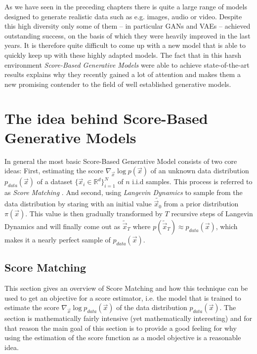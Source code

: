 As we have seen in the preceding chapters there is quite a large range of models designed to generate realistic data such as e.g. images, audio or video. Despite this high diversity only some of them – in particular GANs and VAEs – achieved outstanding success, on the basis of which they were heavily improved in the last years. It is therefore quite difficult to come up with a new model that is able to quickly keep up with these highly adapted models. The fact that in this harsh environment \textit{Score-Based Generative Models} \cite{score_1, score_3, score_2} were able to achieve state-of-the-art results explains why they recently gained a lot of attention and makes them a new promising contender to the field of well established generative models.

\section{The idea behind Score-Based Generative Models}
In general the most basic Score-Based Generative Model consists of two core ideas: First, estimating the score $\nabla_{\vec{x}}\log p(\vec{x})$ of an unknown data distribution $p_{data}(\vec{x})$ of a dataset $\{\vec{x}_i\in \mathbb{R}^d\}_{i=1}^N$ of $n$ i.i.d samples. This process is referred to as \textit{Score Matching} \cite{score_matching_original}. And second, using \textit{Langevin Dynamics} \cite{langevin1, langevin2} to sample from the data distribution by staring with an initial value $\tilde{\vec{x}_0}$ from a prior distribution $\pi(\vec{x})$. This value is then gradually transformed by $T$ recursive steps of Langevin Dynamics and will finally come out as $\tilde{\vec{x}}_T$ where $p(\tilde{\vec{x}}_T)\approx p_{data}(\vec{x})$, which makes it a nearly perfect sample of $p_{data}(\vec{x})$. 
%
\subsection{Score Matching} \label{sec:3.1.1}
This section gives an overview of Score Matching and how this technique can be used to get an objective for a score estimator, i.e. the model that is trained to estimate the score $\nabla_{\vec{x}}\log p_{data}(\vec{x})$ of the data distribution $p_{data}(\vec{x})$. The section is mathematically fairly intensive (yet mathematically interesting) and for that reason the main goal of this section is to provide a good feeling for why using the estimation of the score function as a model objective is a reasonable idea.

